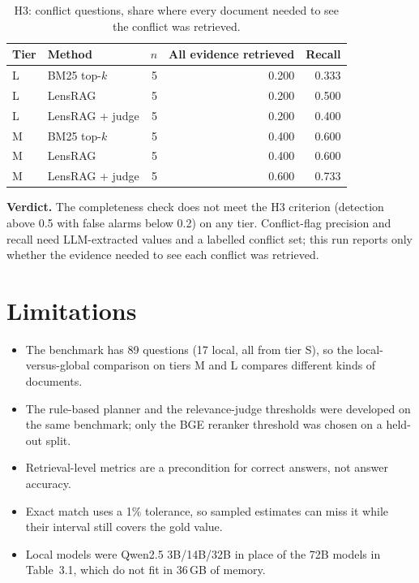 \documentclass[11pt]{article}
\begin{document}
\begin{table}[htbp]
\centering\small
\caption{H3: conflict questions, share where every document needed to see the conflict was retrieved.}
\label{tab:h3conf}
\begin{tabular}{llrrr}
\toprule
Tier & Method & $n$ & All evidence retrieved & Recall \\
\midrule
L & BM25 top-$k$ & 5 & 0.200 & 0.333 \\
L & LensRAG & 5 & 0.200 & 0.500 \\
L & LensRAG + judge & 5 & 0.200 & 0.400 \\
M & BM25 top-$k$ & 5 & 0.400 & 0.600 \\
M & LensRAG & 5 & 0.400 & 0.600 \\
M & LensRAG + judge & 5 & 0.600 & 0.733 \\
\bottomrule
\end{tabular}
\end{table}

\textbf{Verdict.} The completeness check does not meet the H3 criterion (detection above 0.5 with false alarms below 0.2) on any tier. Conflict-flag precision and recall need LLM-extracted values and a labelled conflict set; this run reports only whether the evidence needed to see each conflict was retrieved.

\section{Limitations}

\begin{itemize}
\item The benchmark has 89 questions (17 local, all from tier S), so the local-versus-global comparison on tiers M and L compares different kinds of documents.
\item The rule-based planner and the relevance-judge thresholds were developed on the same benchmark; only the BGE reranker threshold was chosen on a held-out split.
\item Retrieval-level metrics are a precondition for correct answers, not answer accuracy.
\item Exact match uses a 1\% tolerance, so sampled estimates can miss it while their interval still covers the gold value.
\item Local models were Qwen2.5 3B/14B/32B in place of the 72B models in Table~3.1, which do not fit in 36\,GB of memory.
\end{itemize}
\end{document}
